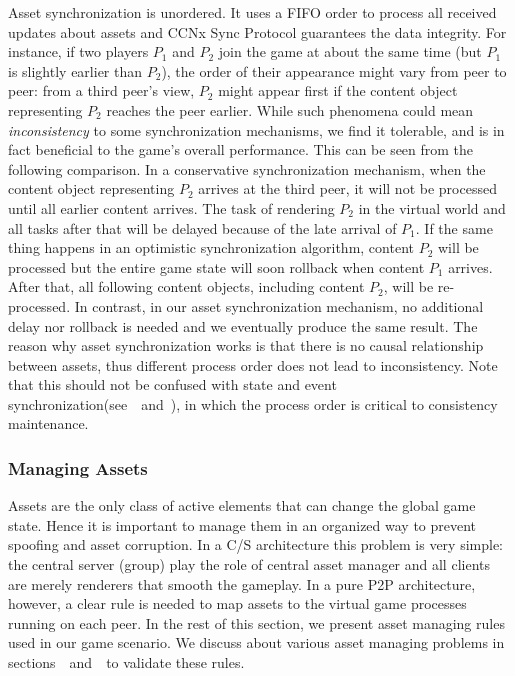 \documentclass{sigchi}
\newcommand{\cs}{C\slash S}
\begin{document}
Asset synchronization is unordered. It uses a FIFO order to process all received updates about assets and CCNx Sync Protocol guarantees the data integrity. For instance, if two players $P_1$ and $P_2$ join the game at about the same time (but $P_1$ is slightly earlier than $P_2$), the order of their appearance might vary from peer to peer: from a third peer's view, $P_2$ might appear first if the content object representing $P_2$ reaches the peer earlier. While such phenomena could mean \emph{inconsistency} to some synchronization mechanisms, we find it tolerable, and is in fact beneficial to the game's overall performance. This can be seen from the following comparison. In a conservative synchronization mechanism, when the content object representing $P_2$ arrives at the third peer, it will not be processed until all earlier content arrives. The task of rendering $P_2$ in the virtual world and all tasks after that will be delayed because of the late arrival of $P_1$. If the same thing happens in an optimistic synchronization algorithm, content $P_2$ will be processed but the entire game state will soon rollback when content $P_1$ arrives. After that, all following content objects, including content $P_2$, will be re-processed. In contrast, in our asset synchronization mechanism, no additional delay nor rollback is needed and we eventually produce the same result. The reason why asset synchronization works is that there is no causal relationship between assets, thus different process order does not lead to inconsistency. Note that this should not be confused with state and event synchronization(see~~and~), in which the process order is critical to consistency maintenance.


\subsubsection{Managing Assets}
\label{manager}
Assets are the only class of active elements that can change the global game state. Hence it is important to manage them in an organized way to prevent spoofing and asset corruption. In a {\cs} architecture this problem is very simple: the central server (group) play the role of central asset manager and all clients are merely renderers that smooth the gameplay. In a pure P2P architecture, however, a clear rule is needed to map assets to the virtual game processes running on each peer. In the rest of this section, we present asset managing rules used in our game scenario. We discuss about various asset managing problems in sections~~and~~to validate these rules.
\end{document}
